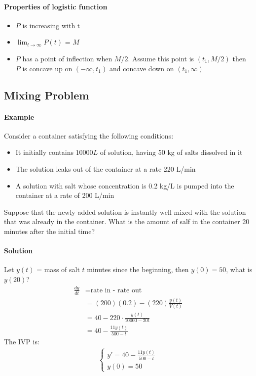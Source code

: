 \documentclass[12pt]{article}
\begin{document}
\paragraph{Properties of logistic function}
\begin{itemize} 
     \item $P$ is increasing with t
     \item $\lim_{t \to \infty} P(t)$ = $M$
     \item $P$ has a point of inflection when $M/2$. Assume this point is $(t_1, M/2)$ then $P$ is concave up on $(-\infty, t_1)$ and concave down on $(t_1, \infty)$
\end{itemize}
\subsection{Mixing Problem}
\paragraph{Example} Consider a container satisfying the following conditions:
\begin{itemize} 
     \item It initially contains $10000 L$ of solution, having 50 kg of salts dissolved in it 
     \item The solution leaks out of the container at a rate 220 L/min
     \item A solution with salt whose concentration is 0.2 kg/L is pumped into the container at a rate of 200 L/min
\end{itemize}
Suppose that the newly added solution is instantly well mixed with the solution that was already in the container. What is the amount of salf in the container
20 minutes after the initial time?

\paragraph{Solution}
Let $y(t)$ = mass of salt $t$ minutes since the beginning, then $y(0) = 50$, what is $y(20)$? 
\begin{align*} 
    \frac{dy}{dt} &= \textrm{rate in - rate out} \\
    &= (200)(0.2) - (220)\frac{y(t)}{V(t)} \\ 
    &= 40 - 220\cdot \frac{y(t)}{10000 - 20t} \\
    &= 40 -\frac{11y(t)}{500 - t} 
\end{align*}
The IVP is:
\begin{align*} 
    \begin{cases} 
    y' = 40 - \frac{11y(t)}{500 - t} \\
    y(0) = 50 
    \end{cases} 
\end{align*}
\end{document}
